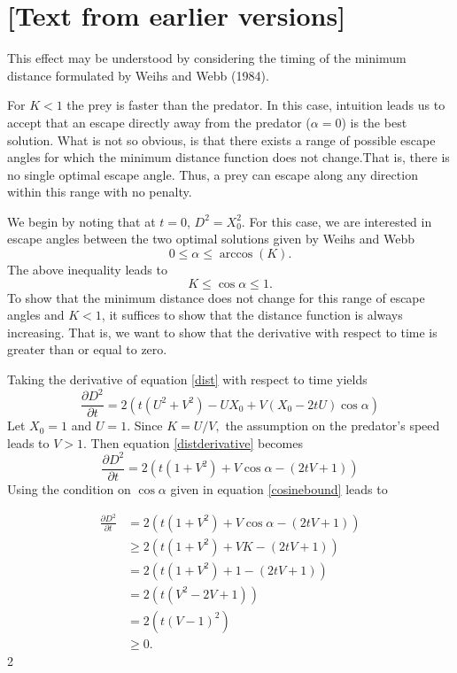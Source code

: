 \documentclass[12pt]{article}
\def\d{\partial}
\begin{document}
\section{[Text from earlier versions]}


This effect may be understood by considering the timing of the minimum distance formulated by Weihs and Webb (1984). 

For $K<1$ the prey is faster than the predator. In this case, intuition leads us to accept that an escape directly away from the predator ($\alpha =0$) is the best solution. What is not so obvious, is that there exists a range of possible escape angles for which the minimum distance function does not change.That is, there is no single optimal escape angle. Thus, a prey can escape along any direction within this range with no penalty.

We begin by noting that at $t=0$, $D^2 = X_0^2.$ For this case, we are interested in escape angles between the two optimal solutions given by Weihs and Webb
%
\begin{equation}
0 \leq \alpha \leq \arccos(K).
\label{anglerange}
\end{equation}
The above inequality leads to 
\begin{equation}
K \leq \cos\alpha \leq 1.
\label{cosinebound}
\end{equation}      
%
To show that the minimum distance does not change for this range of escape angles and $K<1$, it suffices to show that the distance function is always increasing. That is, we want to show that the derivative with respect to time is greater than or equal to zero. 

Taking the derivative of equation \eqref{dist} with respect to time yields
%
\begin{equation}
\frac{\d D^2}{\d t}  = 2(t(U^2+V^2) - UX_0 + V(X_0-2tU)\cos\alpha)
\label{distderivative}
\end{equation}  
%
Let $X_0=1$ and $U=1$. Since $K = U/V,$ the assumption on the predator's speed leads to $V > 1.$ 
Then equation \eqref{distderivative} becomes
%
\begin{equation}
\frac{\d D^2}{\d t}  = 2(t(1+V^2) +V\cos\alpha - (2tV + 1))
\label{distderivative2}
\end{equation}
%
Using the condition on $\cos\alpha$ given in equation \eqref{cosinebound} leads to

\begin{align*}
\frac{\d D^2}{\d t}  & = 2(t(1+V^2) +V\cos\alpha - (2tV + 1)) \\
& \geq 2(t(1+V^2) +VK - (2tV + 1)) \\
& = 2(t(1+V^2) +1 - (2tV + 1)) \\
& = 2(t(V^2- 2V + 1)) \\
& =2(t(V-1)^2)\\
& \geq 0.
\end{align*}2
\end{document}
